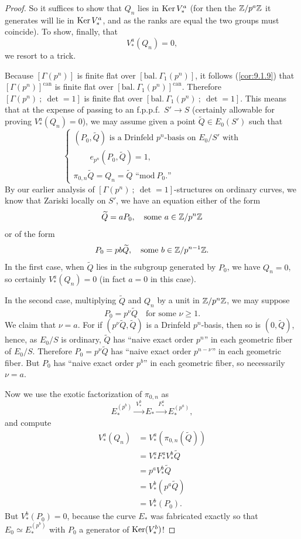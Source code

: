 \begin{proof}
So it suffices to show that $Q_n$ lies in $\operatorname{Ker} V_*^a$ (for then the $\mathbb{Z}/p^a\mathbb{Z}$ it generates will lie in $\operatorname{Ker} V_*^a$, and as the ranks are equal the two groups must coincide). To show, finally, that
\[
V_*^a(Q_n) = 0 ,
\]
we resort to a trick.

Because $[\Gamma(p^n)]$ is finite flat over $[\mathrm{bal.\ }\Gamma_1(p^n)]$, it follows (\ref{cor:9.1.9}) that $[\Gamma(p^n)]^{\mathrm{can}}$ is finite flat over $[\mathrm{bal.\ }\Gamma_1(p^n)]^{\mathrm{can}}$. Therefore $[\Gamma(p^n)\ ;\ \det = 1]$ is finite flat over $[\mathrm{bal.\ }\Gamma_1(p^n)\ ;\ \det = 1]$. This means that at the expense of passing to an f.p.p.f.\ $S' \to S$ (certainly allowable for proving $V_*^a(Q_n) = 0$), we may assume given a point $\widetilde{Q} \in E_0(S')$ such that
\[
\begin{cases}
(P_0, \widetilde{Q}) \text{ is a Drinfeld $p^n$-basis on } E_0/S' \text{ with} \\
\qquad e_{p^n}(P_0, \widetilde{Q}) = 1 , \\
\pi_{0,n} \widetilde{Q} = Q_n = \widetilde{Q} \text{ ``}\mathrm{mod}\ P_0\text{.''}
\end{cases}
\]
By our earlier analysis of $[\Gamma(p^n)\ ;\ \det = 1]$-structures on ordinary curves, we know that Zariski locally on $S'$, we have an equation either of the form
\[
\widetilde{Q} = a P_0 , \quad\text{some } a \in \mathbb{Z}/p^n\mathbb{Z}
\]
or of the form
\[
P_0 = p b \widetilde{Q} , \quad\text{some } b \in \mathbb{Z}/p^{n-1}\mathbb{Z} .
\]
In the first case, when $\widetilde{Q}$ lies in the subgroup generated by $P_0$, we have $Q_n = 0$, so certainly $V_*^a(Q_n) = 0$ (in fact $a = 0$ in this case).

In the second case, multiplying $\widetilde{Q}$ and $Q_n$ by a unit in $\mathbb{Z}/p^n\mathbb{Z}$, we may suppose
\[
P_0 = p^\nu \widetilde{Q} \quad\text{for some } \nu \ge 1 .
\]
We claim that $\nu = a$. For if $(p^\nu \widetilde{Q}, \widetilde{Q})$ is a Drinfeld $p^n$-basis, then so is $(0, \widetilde{Q})$, hence, as $E_0/S$ is ordinary, $\widetilde{Q}$ has ``naive exact order $p^n$'' in each geometric fiber of $E_0/S$. Therefore $P_0 = p^\nu \widetilde{Q}$ has ``naive exact order $p^{n-\nu}$'' in each geometric fiber. But $P_0$ has ``naive exact order $p^b$'' in each geometric fiber, so necessarily $\nu = a$.

Now we use the exotic factorization of $\pi_{0,n}$ as
\[
E_*^{(p^b)} \xrightarrow{\ V_*^b\ } E_* \xrightarrow{\ F_*^a\ } E_*^{(p^a)} ,
\]
and compute
\[
\begin{aligned}
V_*^a(Q_n) &= V_*^a(\pi_{0,n}(\widetilde{Q})) \\
&= V_*^a F_*^a V_*^b \widetilde{Q} \\
&= p^a V_*^b \widetilde{Q} \\
&= V_*^b (p^a \widetilde{Q}) \\
&= V_*^b(P_0) .
\end{aligned}
\]
But $V_*^b(P_0) = 0$, because the curve $E_*$ was fabricated exactly so that $E_0 \simeq E_*^{(p^b)}$ with $P_0$ a generator of $\operatorname{Ker}(V_*^b)$!
\end{proof}

